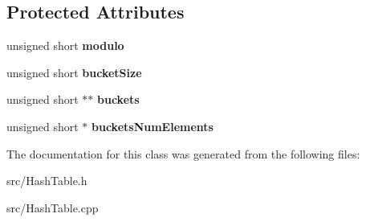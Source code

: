 \subsection*{Protected Attributes}
\begin{DoxyCompactItemize}
\item 
\hypertarget{class_hash_table_a149432410c2675ea94111eef31d118d7}{}unsigned short {\bfseries modulo}\label{class_hash_table_a149432410c2675ea94111eef31d118d7}

\item 
\hypertarget{class_hash_table_a1cb1bb31cc46ee7451580a7bac802a6f}{}unsigned short {\bfseries bucket\+Size}\label{class_hash_table_a1cb1bb31cc46ee7451580a7bac802a6f}

\item 
\hypertarget{class_hash_table_a9bd0b003513563ae2a61a19d0ab2d2ec}{}unsigned short $\ast$$\ast$ {\bfseries buckets}\label{class_hash_table_a9bd0b003513563ae2a61a19d0ab2d2ec}

\item 
\hypertarget{class_hash_table_a69d5a612d5ccd12898aa45d4804da95f}{}unsigned short $\ast$ {\bfseries buckets\+Num\+Elements}\label{class_hash_table_a69d5a612d5ccd12898aa45d4804da95f}

\end{DoxyCompactItemize}


The documentation for this class was generated from the following files\+:\begin{DoxyCompactItemize}
\item 
src/Hash\+Table.\+h\item 
src/Hash\+Table.\+cpp\end{DoxyCompactItemize}
